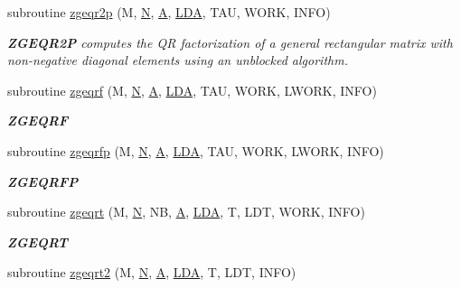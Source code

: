 \begin{DoxyCompactItemize}
subroutine \hyperlink{group__complex16GEcomputational_gaa30b8f4dd026d7cfe34229378f5f331d}{zgeqr2p} (M, \hyperlink{polmisc_8c_a0240ac851181b84ac374872dc5434ee4}{N}, \hyperlink{classA}{A}, \hyperlink{example__user_8c_ae946da542ce0db94dced19b2ecefd1aa}{L\+D\+A}, T\+A\+U, W\+O\+R\+K, I\+N\+F\+O)
\begin{DoxyCompactList}\small\item\em {\bfseries Z\+G\+E\+Q\+R2\+P} computes the Q\+R factorization of a general rectangular matrix with non-\/negative diagonal elements using an unblocked algorithm. \end{DoxyCompactList}\item 
subroutine \hyperlink{group__complex16GEcomputational_ga91323e2e5f9678324dde6fd72f1e6bd1}{zgeqrf} (M, \hyperlink{polmisc_8c_a0240ac851181b84ac374872dc5434ee4}{N}, \hyperlink{classA}{A}, \hyperlink{example__user_8c_ae946da542ce0db94dced19b2ecefd1aa}{L\+D\+A}, T\+A\+U, W\+O\+R\+K, L\+W\+O\+R\+K, I\+N\+F\+O)
\begin{DoxyCompactList}\small\item\em {\bfseries Z\+G\+E\+Q\+R\+F} \end{DoxyCompactList}\item 
subroutine \hyperlink{group__complex16GEcomputational_gadb2733d56f109ea5b0f016a683687d2a}{zgeqrfp} (M, \hyperlink{polmisc_8c_a0240ac851181b84ac374872dc5434ee4}{N}, \hyperlink{classA}{A}, \hyperlink{example__user_8c_ae946da542ce0db94dced19b2ecefd1aa}{L\+D\+A}, T\+A\+U, W\+O\+R\+K, L\+W\+O\+R\+K, I\+N\+F\+O)
\begin{DoxyCompactList}\small\item\em {\bfseries Z\+G\+E\+Q\+R\+F\+P} \end{DoxyCompactList}\item 
subroutine \hyperlink{group__complex16GEcomputational_ga3e62c39db15928f660b34d3a107aee85}{zgeqrt} (M, \hyperlink{polmisc_8c_a0240ac851181b84ac374872dc5434ee4}{N}, N\+B, \hyperlink{classA}{A}, \hyperlink{example__user_8c_ae946da542ce0db94dced19b2ecefd1aa}{L\+D\+A}, T, L\+D\+T, W\+O\+R\+K, I\+N\+F\+O)
\begin{DoxyCompactList}\small\item\em {\bfseries Z\+G\+E\+Q\+R\+T} \end{DoxyCompactList}\item 
subroutine \hyperlink{group__complex16GEcomputational_gaf3cc243f2912f6bf569c4ec61e071413}{zgeqrt2} (M, \hyperlink{polmisc_8c_a0240ac851181b84ac374872dc5434ee4}{N}, \hyperlink{classA}{A}, \hyperlink{example__user_8c_ae946da542ce0db94dced19b2ecefd1aa}{L\+D\+A}, T, L\+D\+T, I\+N\+F\+O)

\end{DoxyCompactItemize}
